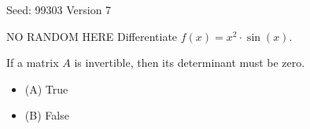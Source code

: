 \documentclass[12pt]{exam}
\begin{document}
{\small Seed: 99303 \hfill Version 7}

\vspace{1em}

\begin{questions}


\question NO RANDOM HERE Differentiate $f(x) = x^2 \cdot \sin(x)$.




  \vspace{2\baselineskip}  %






\vspace{1em}

\question If a matrix $A$ is invertible, then its determinant must be zero.




  \begin{itemize}[label={}]
    \item (A) True
    \item (B) False
  \end{itemize}







\vspace{1em}


\end{questions}
\end{document}
